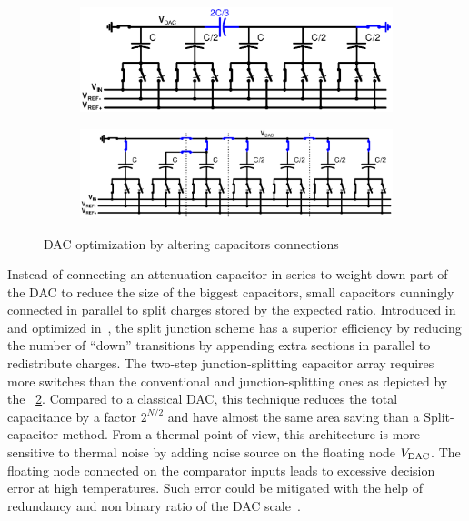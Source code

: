 \begin{figure}[htp]
	\centering
	\begin{subfigure}[b]{0.46\textwidth}
		\includegraphics[width=\textwidth]{Chapter3/Figs/sar_split_cap_dac.ps}
		\label{fig:split_capacitor}
	\end{subfigure}
	\begin{subfigure}[b]{0.52\textwidth}
		\includegraphics[width=\textwidth]{Chapter3/Figs/sar_split_junction_dac.ps}
		\label{fig:split_junction}
	\end{subfigure}
	\caption{DAC optimization by altering capacitors connections}
	\label{fig:sar_split_dac}
\end{figure}

Instead of connecting an attenuation capacitor in series to weight down part of the DAC to reduce the size of the biggest capacitors, small capacitors cunningly connected in parallel to split charges stored by the expected ratio. Introduced in~\cite{Lee2008} and optimized in~\cite{Yu2010}, the split junction scheme has a superior efficiency by reducing the number of ``down'' transitions by appending extra sections in parallel to redistribute charges. The two-step junction-splitting capacitor array requires more switches than the conventional and junction-splitting ones as depicted by the \figurename~\ref{fig:split_junction}. Compared to a classical DAC, this technique reduces the total capacitance by a factor \(2^{N/2}\) and have almost the same area saving than a Split-capacitor method. From a thermal point of view, this architecture is more sensitive to thermal noise by adding noise source on the floating node \(V_{\rm DAC}\). The floating node connected on the comparator inputs leads to excessive decision error at high temperatures. Such error could be mitigated with the help of redundancy and non binary ratio of the DAC scale~\cite{Zhang2014}.

